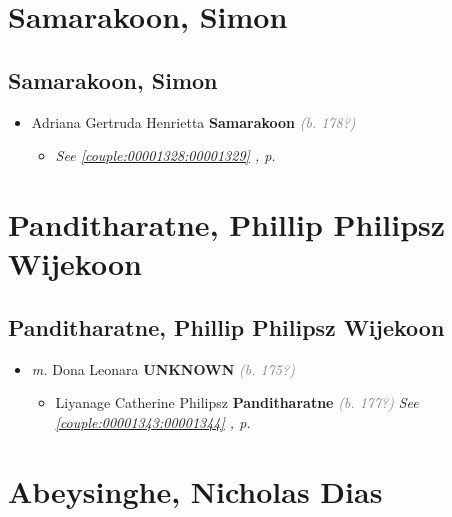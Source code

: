 \documentclass[10pt, openany]{book}
\begin{document}
\part{Samarakoon, Simon}
\chapter{Samarakoon, Simon}
\label{00001330}
\textcolor{slmaroon}{\textit{}}
\begin{itemize}
\item{Adriana Gertruda Henrietta \textbf{Samarakoon} \textcolor{gray}{\textit{(b. 178?)}}
\begin{itemize}
\item{\textcolor{slteal}{\textit{See  \autoref{couple:00001328:00001329} \textit{, p. \pageref{couple:00001328:00001329} }}}}
\end{itemize}
   }
\end{itemize}
 
\part{Panditharatne, Phillip Philipsz Wijekoon}
\chapter{Panditharatne, Phillip Philipsz Wijekoon}
\label{00001345}
\textcolor{slmaroon}{\textit{}}
\begin{itemize}
\item{\textit{m.} Dona Leonara \textbf{UNKNOWN} \textcolor{gray}{\textit{(b. 175?)}}   \label{couple:00001345:00001346} \begin{itemize}
\item{Liyanage Catherine Philipsz \textbf{Panditharatne} \textcolor{gray}{\textit{(b. 177?)}} \textcolor{slteal}{\textit{See  \autoref{couple:00001343:00001344} \textit{, p. \pageref{couple:00001343:00001344} }}}}
\end{itemize}}
\end{itemize}
   
\part{Abeysinghe, Nicholas Dias}
\end{document}
